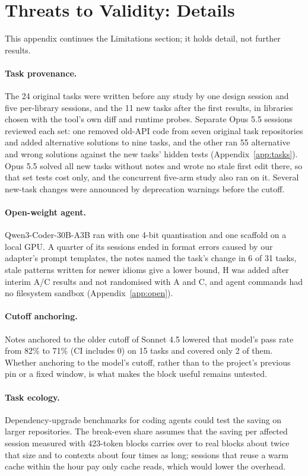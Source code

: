 \documentclass[11pt]{article}
\begin{document}
\section{Threats to Validity: Details}
\label{app:threats}

This appendix continues the Limitations section; it holds detail, not further results.

\paragraph{Task provenance.} The 24 original tasks were written before any study by one design session and five per-library sessions, and the 11 new tasks after the first results, in libraries chosen with the tool's own diff and runtime probes. Separate Opus 5.5 sessions reviewed each set: one removed old-API code from seven original task repositories and added alternative solutions to nine tasks, and the other ran 55 alternative and wrong solutions against the new tasks' hidden tests (Appendix~\ref{app:tasks}). Opus 5.5 solved all new tasks without notes and wrote no stale first edit there, so that set tests cost only, and the concurrent five-arm study also ran on it. Several new-task changes were announced by deprecation warnings before the cutoff.

\paragraph{Open-weight agent.} Qwen3-Coder-30B-A3B ran with one 4-bit quantisation and one scaffold on a local GPU. A quarter of its sessions ended in format errors caused by our adapter's prompt templates, the notes named the task's change in 6 of 31 tasks, stale patterns written for newer idioms give a lower bound, H was added after interim A/C results and not randomised with A and C, and agent commands had no filesystem sandbox (Appendix~\ref{app:open}).

\paragraph{Cutoff anchoring.} Notes anchored to the older cutoff of Sonnet 4.5 lowered that model's pass rate from 82\% to 71\% (CI includes 0) on 15 tasks and covered only 2 of them. Whether anchoring to the model's cutoff, rather than to the project's previous pin or a fixed window, is what makes the block useful remains untested.

\paragraph{Task ecology.} Dependency-upgrade benchmarks for coding agents \citep{luo2026depbench} could test the saving on larger repositories. The break-even share assumes that the saving per affected session measured with 423-token blocks carries over to real blocks about twice that size and to contexts about four times as long; sessions that reuse a warm cache within the hour pay only cache reads, which would lower the overhead.
\end{document}
